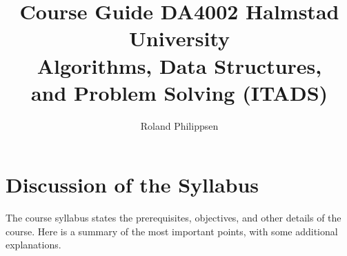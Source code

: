 \documentclass[a4paper]{article}
\begin{document}
\title{{\normalsize Course Guide DA4002 Halmstad University}\\
  Algorithms, Data Structures,\\ and Problem Solving (ITADS)}
\author{Roland Philippsen}
\maketitle



\section{Discussion of the Syllabus}

The course syllabus states the prerequisites, objectives, and other details of the course.
Here is a summary of the most important points, with some additional explanations.
\end{document}
